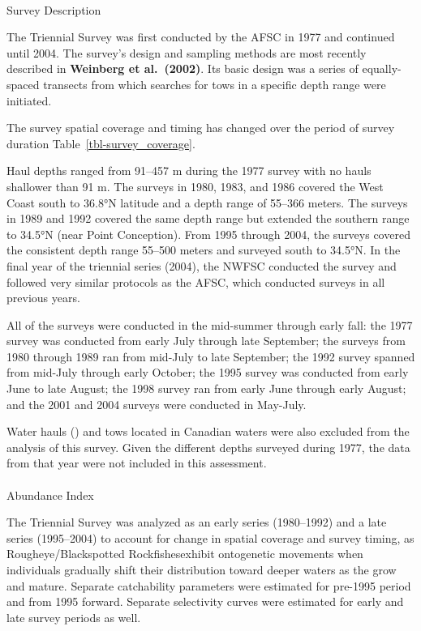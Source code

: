 \documentclass[
]{scrartcl}
\makeatletter
\let\oldparagraph\paragraph
\renewcommand{\paragraph}{
    \@ifstar
      \xxxParagraphStar
      \xxxParagraphNoStar
  }
\newcommand{\xxxParagraphStar}[1]{\oldparagraph*{#1}\mbox{}}
\newcommand{\xxxParagraphNoStar}[1]{\oldparagraph{#1}\mbox{}}
\makeatother
\begin{document}
\paragraph{Survey Description}\label{survey-description-1}

The Triennial Survey was first conducted by the AFSC in 1977 and
continued until 2004. The survey's design and sampling methods are most
recently described in \textbf{Weinberg et al.~(2002)}. Its basic design
was a series of equally-spaced transects from which searches for tows in
a specific depth range were initiated.

The survey spatial coverage and timing has changed over the period of
survey duration Table~\ref{tbl-survey_coverage}.

Haul depths ranged from 91--457 m during the 1977 survey with no hauls
shallower than 91 m. The surveys in 1980, 1983, and 1986 covered the
West Coast south to 36.8°N latitude and a depth range of 55--366 meters.
The surveys in 1989 and 1992 covered the same depth range but extended
the southern range to 34.5°N (near Point Conception). From 1995 through
2004, the surveys covered the consistent depth range 55--500 meters and
surveyed south to 34.5°N. In the final year of the triennial series
(2004), the NWFSC conducted the survey and followed very similar
protocols as the AFSC, which conducted surveys in all previous years.

All of the surveys were conducted in the mid-summer through early fall:
the 1977 survey was conducted from early July through late September;
the surveys from 1980 through 1989 ran from mid-July to late September;
the 1992 survey spanned from mid-July through early October; the 1995
survey was conducted from early June to late August; the 1998 survey ran
from early June through early August; and the 2001 and 2004 surveys were
conducted in May-July.

Water hauls () and
tows located in Canadian waters were also excluded from the analysis of
this survey. Given the different depths surveyed during 1977, the data
from that year were not included in this assessment.

\paragraph{Abundance Index}\label{abundance-index-1}

The Triennial Survey was analyzed as an early series (1980--1992) and a
late series (1995--2004) to account for change in spatial coverage and
survey timing, as Rougheye/Blackspotted Rockfishesexhibit ontogenetic
movements when individuals gradually shift their distribution toward
deeper waters as the grow and mature. Separate catchability parameters
were estimated for pre-1995 period and from 1995 forward. Separate
selectivity curves were estimated for early and late survey periods as
well.
\end{document}
